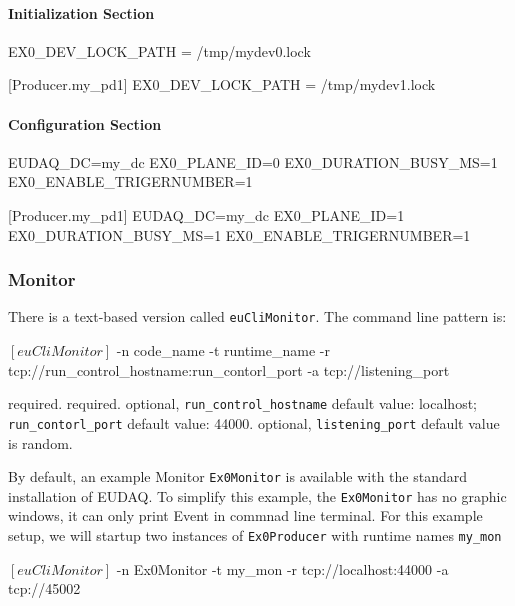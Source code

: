 \paragraph{Initialization Section}
\begin{listing}[conf]
[Producer.my_pd0]
EX0_DEV_LOCK_PATH = /tmp/mydev0.lock

[Producer.my_pd1]
EX0_DEV_LOCK_PATH = /tmp/mydev1.lock
\end{listing}

\paragraph{Configuration Section}
\begin{listing}[conf]
[Producer.my_pd0]
EUDAQ_DC=my_dc
EX0_PLANE_ID=0
EX0_DURATION_BUSY_MS=1
EX0_ENABLE_TRIGERNUMBER=1

[Producer.my_pd1]
EUDAQ_DC=my_dc
EX0_PLANE_ID=1
EX0_DURATION_BUSY_MS=1
EX0_ENABLE_TRIGERNUMBER=1
\end{listing}

\subsubsection{Monitor}
\label{sec:onlinemonitor}
There is a text-based version called \texttt{euCliMonitor}.
The command line pattern is:
\begin{listing}[mybash]
$[euCliMonitor]$ -n {code_name} -t {runtime_name} -r tcp://{run_control_hostname}:{run_contorl_port} -a tcp://{listening_port}
\end{listing}
\begin{description}
required.
required.
optional, \texttt{run\_control\_hostname} default value: localhost;  \texttt{run\_contorl\_port}  default value: 44000.
optional, \texttt{listening\_port} default value is random.
\end{description}

By default, an example Monitor \texttt{Ex0Monitor} is available with the standard installation of EUDAQ. To simplify this example, the \texttt{Ex0Monitor} has no graphic windows, it can only print Event in commnad line terminal.
For this example setup, we will startup two instances of \texttt{Ex0Producer} with runtime names \texttt{my\_mon}\\
\begin{listing}[mybash]
$[euCliMonitor]$ -n Ex0Monitor -t my_mon -r tcp://localhost:44000 -a tcp://45002
\end{listing}

